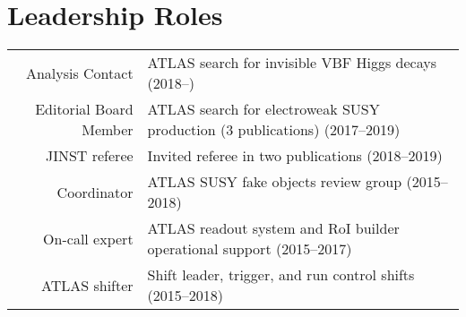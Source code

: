 \documentclass[a4paper,10pt]{article}
\begin{document}
\vspace{3mm}
\section{Leadership Roles}
\begin{tabular}{r | p{12cm}}
\multicolumn{1}{r|}{Analysis Contact}			& ATLAS search for invisible VBF Higgs decays  \hfill (2018--\phantom{0000}) \\
\multicolumn{1}{r|}{Editorial Board Member}		& ATLAS search for electroweak SUSY production (3 publications)  \hfill (2017--2019)\\
\multicolumn{1}{r|}{JINST referee}		        & Invited referee in two publications \hfill (2018--2019)	\\
\multicolumn{1}{r|}{Coordinator}              & ATLAS SUSY fake objects review group  \hfill (2015--2018)         \\
\multicolumn{1}{r|}{On-call expert}              & ATLAS readout system and RoI builder operational support	\hfill (2015--2017)					\\
\multicolumn{1}{r|}{ATLAS shifter}			     & Shift leader, trigger, and run control shifts	\hfill (2015--2018)					\\
\end{tabular}


\vspace{3mm}
\end{document}
